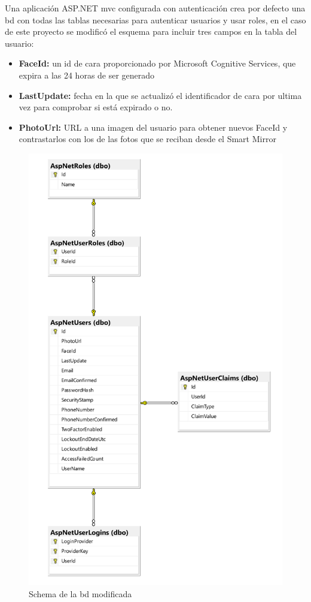 Una aplicación ASP.NET \acrshort{mvc} configurada con autenticación crea por defecto una \acrshort{bd} con todas las tablas necesarias para autenticar usuarios y usar roles, en el caso de este proyecto se modificó el esquema para incluir tres campos en la tabla del usuario:

\begin{itemize}
\item \textbf{FaceId:} un id de cara proporcionado por Microsoft Cognitive Services, que expira a las 24 horas de ser generado
\item \textbf{LastUpdate:} fecha en la que se actualizó el identificador de cara por ultima vez para comprobar si está expirado o no.
\item \textbf{PhotoUrl:} URL a una imagen del usuario para obtener nuevos FaceId y contrastarlos con los de las fotos que se reciban desde el Smart Mirror
\end{itemize}

\begin{figure}[!htp]
	\centering
	\includegraphics[angle=0, page=1, scale=.65]{fig/schema}
	\caption{Schema de la \acrshort{bd} modificada}
\end{figure}

\FloatBarrier
